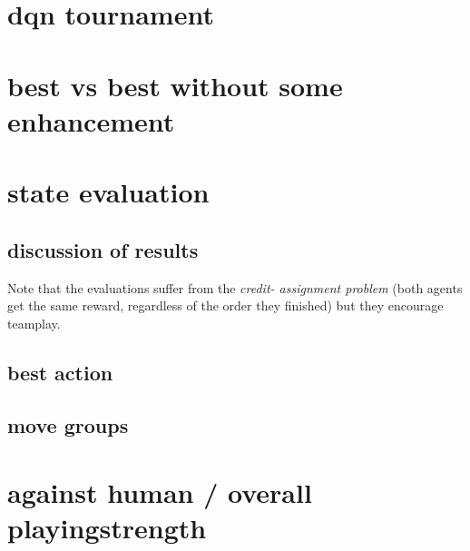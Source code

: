 \section{dqn tournament}
\section{best vs best without some enhancement}
\section{state evaluation}
\label{sec:evaluationexp}
\subsection{discussion of results}
Note that the evaluations suffer from the \textit{credit- assignment problem} (both agents get the same reward, regardless of the order they finished) but they encourage teamplay.
\subsection{best action}
\label{sec:bestactionexp}
\subsection{move groups}
\label{sec:movegroupsexp}



\section{against human / overall playingstrength}
